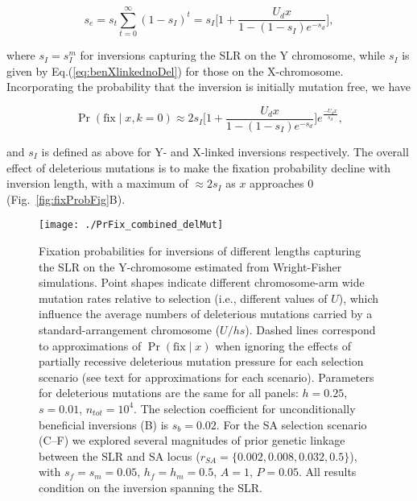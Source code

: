 \documentclass[11pt]{article}
\begin{document}
\begin{equation} \label{eq:benSe}
	s_{e} = s_t \sum_{t=0}^{\infty} (1 - s_I)^t = s_I \Bigg[1 + \frac{U_d x}{1 - (1-s_I)e^{-s_d}} \Bigg],
\end{equation}

\noindent where $s_I = s_{I}^{m}$ for inversions capturing the SLR on the Y chromosome, while $s_I$ is given by Eq.(\ref{eq:benXlinkednoDel}) for those on the X-chromosome. Incorporating the probability that the inversion is initially mutation free, we have

\begin{equation} \label{eq:benPrFix}
	\Pr(\text{fix} \mid x, k = 0) \approx 2 s_I \Bigg[ 1+ \frac{U_d x}{1 - (1-s_I)e^{-s_d}} \Bigg] e^{\frac{-U_d x}{s_d}},
\end{equation}

\noindent and $s_I$ is defined as above for Y- and X-linked inversions respectively. The overall effect of deleterious mutations is to make the fixation probability decline with inversion length, with a maximum of $\approx 2 s_I$ as $x$ approaches $0$ (Fig.~\ref{fig:fixProbFig}B). 
\vspace{12pt}




 \begin{figure}[htbp]
 \centering
 \texttt{[image: ./PrFix\_combined\_delMut]}
 \caption[\captionsize]{Fixation probabilities for inversions of different lengths capturing the SLR on the Y-chromosome estimated from Wright-Fisher simulations. Point shapes indicate different chromosome-arm wide mutation rates relative to selection (i.e., different values of $U$), which influence the average numbers of deleterious mutations carried by a standard-arrangement chromosome ($U/hs$). Dashed lines correspond to approximations of $\Pr(\text{fix} \mid x)$ when ignoring the effects of partially recessive deleterious mutation pressure for each selection scenario (see text for approximations for each scenario). Parameters for deleterious mutations are the same for all panels: $h = 0.25$, $s = 0.01$, $n_{tot} = 10^4$. The selection coefficient for unconditionally beneficial inversions (B) is $s_b = 0.02$. For the SA selection scenario (C--F) we explored several magnitudes of prior genetic linkage between the SLR and SA locus ($r_{SA} = \{ 0.002, 0.008, 0.032, 0.5\}$), with $s_f = s_m = 0.05$, $h_f = h_m = 0.5$, $A = 1$, $P = 0.05$. All results condition on the inversion spanning the SLR.}
 \label{fig:PrFixFig}
 \end{figure}
\end{document}
